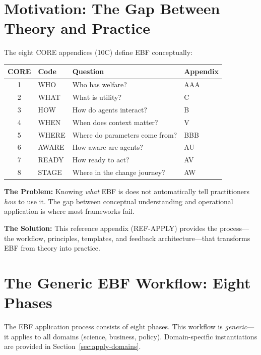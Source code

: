 \section{Motivation: The Gap Between Theory and Practice}
\label{sec:apply-motivation}

The eight CORE appendices (10C) define EBF conceptually:

\begin{center}
\begin{tabular}{@{}clll@{}}
\toprule
\textbf{CORE} & \textbf{Code} & \textbf{Question} & \textbf{Appendix} \\
\midrule
1 & WHO & Who has welfare? & AAA \\
2 & WHAT & What is utility? & C \\
3 & HOW & How do agents interact? & B \\
4 & WHEN & When does context matter? & V \\
5 & WHERE & Where do parameters come from? & BBB \\
6 & AWARE & How aware are agents? & AU \\
7 & READY & How ready to act? & AV \\
8 & STAGE & Where in the change journey? & AW \\
\bottomrule
\end{tabular}
\end{center}

\textbf{The Problem:} Knowing \textit{what} EBF is does not automatically tell
practitioners \textit{how} to use it. The gap between conceptual understanding
and operational application is where most frameworks fail.

\textbf{The Solution:} This reference appendix (REF-APPLY) provides the process---the
workflow, principles, templates, and feedback architecture---that transforms EBF
from theory into practice.



\section{The Generic EBF Workflow: Eight Phases}
\label{sec:apply-workflow}

The EBF application process consists of eight phases. This workflow is
\textit{generic}---it applies to all domains (science, business, policy).
Domain-specific instantiations are provided in Section~\ref{sec:apply-domains}.

